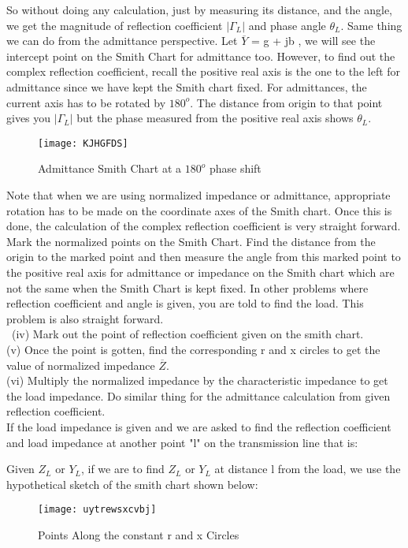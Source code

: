 So without doing any calculation, just by measuring its distance, and the angle, we get the magnitude of reflection coefficient   $|\Gamma_L|$
and phase angle $\theta_L$. Same thing we can do from the admittance perspective. Let $\overline{Y}$ = g + jb , we will see the intercept point on the Smith Chart for admittance too. However, to find out the complex reflection coefficient, recall the positive real axis is the one to the left for admittance since we have kept the Smith chart fixed. For admittances, the current axis has to be rotated by $180^o$. The distance from origin to that point gives you  $|\Gamma_L|$ but the phase measured from the  positive real axis shows $\theta_L$. 
\begin{figure}[h]
	\centering
	\texttt{[image: KJHGFDS]}
	\caption{Admittance Smith Chart at a $180^o$ phase shift}
	\label{fig:kjhgfds}
\end{figure}

Note that when we are using normalized impedance or admittance, appropriate rotation has to be made on the coordinate axes of the Smith chart. Once this is done, the calculation of the complex reflection coefficient is very straight forward. Mark the normalized points on the Smith Chart. Find the distance from the origin to the marked point and then measure the angle from this marked point to the positive real axis for admittance or impedance on the  Smith chart which are not the same when the Smith Chart is kept fixed. In other problems where reflection coefficient and angle is given, you are told to find the load. This problem is also straight forward.\\\
(iv) Mark out the point of  reflection coefficient given on the smith chart.\\
(v) Once the point is gotten, find the corresponding r and x circles to get the value of normalized impedance $\overline{Z}$.\\
(vi) Multiply the normalized impedance by the characteristic impedance to get the load impedance. Do similar thing for the admittance calculation from given reflection coefficient.\\


 If the load impedance is given and we are asked to find the reflection coefficient and load impedance at another point "l" on the transmission line that is:

 Given $Z_L$ or $Y_L$, if we are to find $Z_L$ or $Y_L$ at distance l from the load, we use the hypothetical sketch of the smith chart shown below:\\
\begin{figure}[h]
	\centering
	\texttt{[image: uytrewsxcvbj]}
	\caption{Points Along the constant r and x Circles}
	\label{fig:uytrewsxcvbj}
\end{figure}

